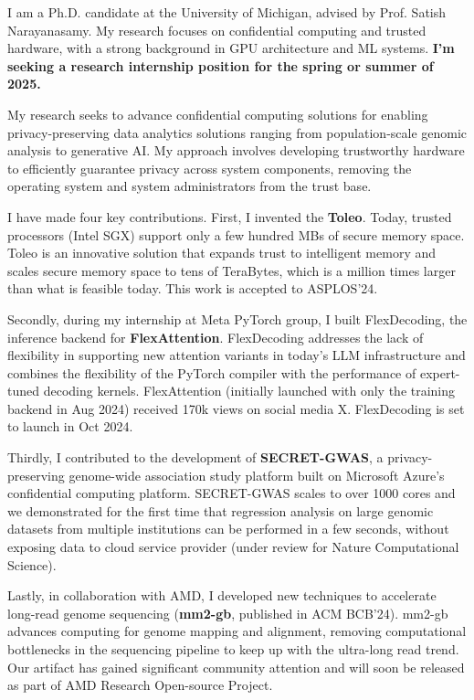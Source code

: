 I am a Ph.D. candidate at the University of Michigan, advised by Prof. Satish Narayanasamy. My research focuses on confidential computing and trusted hardware, with a strong background in GPU architecture and ML systems. \textbf{I'm seeking a research internship position for the spring or summer of 2025. }\par
My research seeks to advance confidential computing solutions for enabling privacy-preserving data analytics solutions ranging from population-scale genomic analysis to generative AI. My approach involves developing trustworthy hardware to efficiently guarantee privacy across system components, removing the operating system and system administrators from the trust base. \par

\vspace{3ex}

I have made four key contributions. First, I invented the \textbf{Toleo}. Today, trusted processors (Intel SGX) support only a few hundred MBs of secure memory space. Toleo is an innovative solution that expands trust to intelligent memory and scales secure memory space to tens of TeraBytes, which is a million times larger than what is feasible today. This work is accepted to ASPLOS'24. \par


Secondly, during my internship at Meta PyTorch group, I built FlexDecoding, the inference backend for \textbf{FlexAttention}. FlexDecoding addresses the lack of flexibility in supporting new attention variants in today's LLM infrastructure and combines the flexibility of the PyTorch compiler with the performance of expert-tuned decoding kernels. FlexAttention (initially launched with only the training backend in Aug 2024) received 170k views on social media X. FlexDecoding is set to launch in Oct 2024. \par


Thirdly, I contributed to the development of \textbf{SECRET-GWAS}, a privacy-preserving genome-wide association study platform built on Microsoft Azure's confidential computing platform.  SECRET-GWAS scales to over 1000 cores and we demonstrated for the first time that regression analysis on large genomic datasets from multiple institutions can be performed in a few seconds, without exposing data to cloud service provider (under review for Nature Computational Science).\par

Lastly, in collaboration with AMD, I developed new techniques to accelerate long-read genome sequencing (\textbf{mm2-gb}, published in ACM BCB'24). mm2-gb advances computing for genome mapping and alignment, removing computational bottlenecks in the sequencing pipeline to keep up with the ultra-long read trend. Our artifact has gained significant community attention and will soon be released as part of AMD Research Open-source Project. \par

